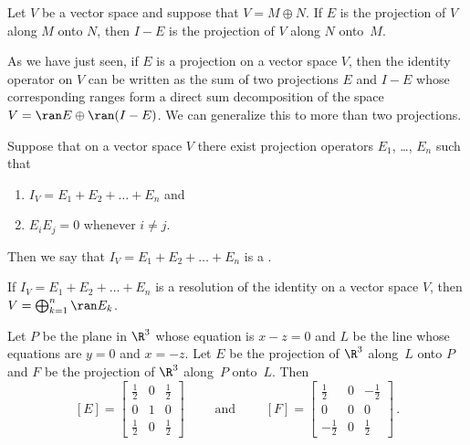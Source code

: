 \begin{prop} Let $V$ be a vector space and suppose that $V = M \oplus N$.  If $E$ is the
projection of $V$ along $M$ onto $N$, then $I - E$ is the projection of $V$ along $N$
onto~$M$.
\end{prop}

As we have just seen, if $E$ is a projection on a vector space $V$, then the identity
operator on $V$ can be written as the sum of two projections $E$ and $I - E$ whose
corresponding ranges form a direct sum decomposition of the space $V = \ran E \oplus \ran
(I - E)$.  We can generalize this to more than two projections.

\begin{defn} Suppose that on a vector space $V$ there exist projection operators $E_1$,
\dots, $E_n$ such that
\begin{enumerate}
    \item $I_V = E_1 + E_2 + \dots + E_n$ and
    \item $E_iE_j = 0$ whenever $i \ne j$.
\end{enumerate}
Then we say that $I_V = E_1 + E_2 + \dots + E_n$ is a
.
\end{defn}

\begin{prop} If $I_V = E_1 + E_2 + \dots + E_n$ is a resolution of the identity on a vector
space $V$, then $V = \bigoplus_{k=1}^n \ran E_k$.
\end{prop}

\begin{exam} Let $P$ be the plane in $\R^3$ whose equation is $x - z = 0$ and $L$ be the line
whose equations are $y = 0$ and $x = -z$.  Let $E$ be the projection of $\R^3$ along~$L$
onto $P$ and $F$ be the projection of $\R^3$ along~$P$ onto~$L$.  Then
 \[[E] = \begin{bmatrix}
              \frac12  & 0 & \frac12 \\
                  0    & 1 &   0     \\
              \frac12  & 0 & \frac12
         \end{bmatrix} \qquad \text{ and } \qquad
   [F] = \begin{bmatrix}
              \frac12  & 0 & -\frac12 \\
                  0    & 0 &   0     \\
             -\frac12  & 0 &  \frac12
         \end{bmatrix}\,. \]
\end{exam}

